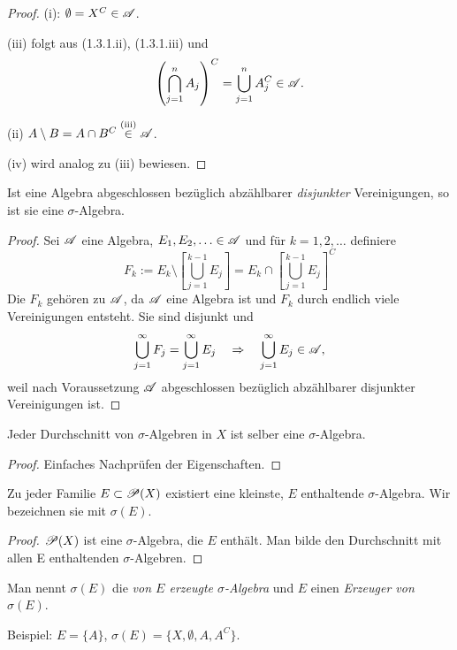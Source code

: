 \begin{proof}
 (i): $\emptyset = X^C \in \mathscr{A}$.
  
 (iii) folgt aus (1.3.1.ii), (1.3.1.iii) und 
 \[ \left( \bigcap_{j=1}^n A_j \right)^C = \bigcup_{j=1}^n A_j^C \in \mathscr{A}. \]
 
 (ii) $A \setminus B = A \cap B^C \overset{\text{(iii)}}\in \mathscr{A}$.
 
 (iv) wird analog zu (iii) bewiesen.
\end{proof}

\begin{thm}
 Ist eine Algebra abgeschlossen bezüglich abzählbarer \emph{disjunkter} Vereinigungen, so ist sie eine $\sigma$-Algebra.
\end{thm}

\begin{proof}
 Sei $\mathscr{A}$ eine Algebra, $E_1, E_2, \ldots \in \mathscr{A}$ und für $k = 1, 2, \ldots$ definiere
 \[ F_k := E_k \setminus \left[ \bigcup_{j=1}^{k-1} E_j \right] = E_k \cap \left[ \bigcup_{j=1}^{k-1} E_j \right]^C \]
 Die $F_k$ gehören zu $\mathscr{A}$, da $\mathscr{A}$ eine Algebra ist und $F_k$ durch endlich viele Vereinigungen entsteht. Sie sind disjunkt und
 \[ \bigcup_{j=1}^\infty F_j = \bigcup_{j=1}^\infty E_j \quad \Rightarrow \quad \bigcup_{j=1}^\infty E_j \in \mathscr{A}, \]
 weil nach Voraussetzung $\mathscr{A}$ abgeschlossen bezüglich abzählbarer disjunkter Vereinigungen ist.
\end{proof}

\begin{lem}
 Jeder Durchschnitt von $\sigma$-Algebren in $X$ ist selber eine $\sigma$-Algebra.
\end{lem}

\begin{proof}
 Einfaches Nachprüfen der Eigenschaften.
\end{proof}

\begin{folg}
 Zu jeder Familie $E \subset \mathscr{P}(X)$ existiert eine kleinste, $E$ enthaltende $\sigma$-Algebra. Wir bezeichnen sie mit $\sigma(E)$.
\end{folg}

\begin{proof}
 $\mathscr{P}(X)$ ist eine $\sigma$-Algebra, die $E$ enthält. Man bilde den Durchschnitt mit allen E enthaltenden $\sigma$-Algebren.
\end{proof}

Man nennt $\sigma(E)$ die \emph{von $E$ erzeugte $\sigma$-Algebra} und $E$ einen \emph{Erzeuger von $\sigma(E)$}.

Beispiel: $E = \{A\}$, $\sigma(E) = \{ X, \emptyset, A, A^C \}$.

